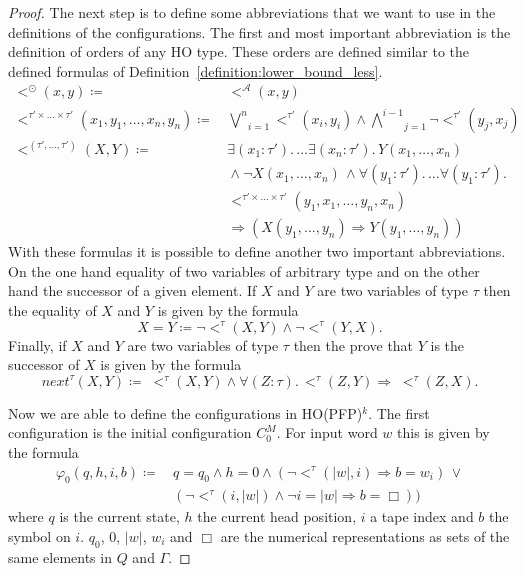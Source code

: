 \begin{proof}
    The next step is to define some abbreviations that we want to use in the definitions of the configurations. The
    first and most important abbreviation is the definition of orders of any HO type. These orders are defined similar
    to the defined formulas of Definition~\ref{definition:lower_bound_less}.
    \begin{align*}
        <^\odot(x, y) \coloneqq &\,<^\mathcal{A}(x, y) \\
        <^{\tau' \times \dots \times \tau'}(x_1, y_1, \dots, x_n, y_n) \coloneqq &\,\underset{i =
        1}{\overset{n}{\bigvee}}<^{\tau'}(x_i, y_i) \wedge \underset{j = 1}{\overset{i - 1}{\bigwedge}}
        \neg <^{\tau'}(y_j, x_j)\\
        <^{(\tau', \dots, \tau')}(X, Y) \coloneqq &\,\exists (x_1 \colon {\tau'}). \,\dots \exists(x_n \colon
        {\tau'}).\, Y(x_1, \dots, x_n)
        \\&\,\wedge \neg X(x_1, \dots, x_n)\,\wedge \forall (y_1 \colon {\tau'}). \,\dots
        \forall(y_1 \colon {\tau'}).\,\\&\,<^{\tau'\times \dots \times \tau'}
        (y_1, x_1, \dots, y_n, x_n) \\&\,\Rightarrow (X(y_1, \dots, y_n) \Rightarrow Y(y_1, \dots, y_n))
    \end{align*}
    With these formulas it is possible to define another two important abbreviations. On the one hand equality
    of two variables of arbitrary type and on the other hand the successor of a given element. If $X$ and
    $Y$ are two variables of type $\tau$ then the equality of $X$ and $Y$ is given by the formula
    \[X = Y \coloneqq \neg<^\tau(X, Y) \wedge \neg <^\tau(Y, X).\]
    Finally, if $X$ and $Y$ are two variables of type $\tau$ then the prove that $Y$ is the successor of $X$ is given by
    the formula
    \[next^{\tau}(X, Y) \coloneqq\; <^\tau(X, Y) \wedge \forall (Z \colon \tau).\, <^\tau(Z, Y) \Rightarrow\;<^\tau
    (Z, X).\]

    Now we are able to define the configurations in HO(PFP)$^k$. The first configuration is the initial configuration
    $C_0^M$. For input word $w$ this is given by the formula
    \begin{align*}
        \varphi_0(q, h, i, b) \coloneqq &\,q = q_0 \wedge h = 0 \wedge (\neg <^\tau(|w|, i) \Rightarrow b = w_{i})\,
        \vee\\&\,(\neg <^\tau (i, |w|) \wedge \neg i = |w| \Rightarrow b = \Box))
    \end{align*}
    where $q$ is the current state, $h$ the current head position, $i$ a tape index and $b$ the symbol on $i$. $q_0$,
    $0$, $|w|$, $w_{i}$ and $\Box$ are the numerical representations as sets of the same elements in $Q$ and $\Gamma$.


\end{proof}
